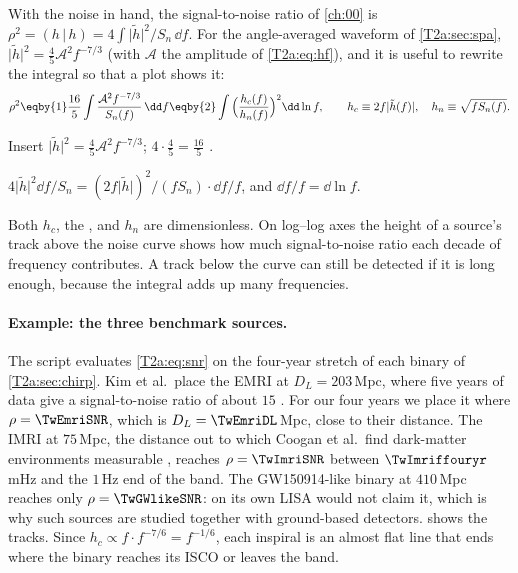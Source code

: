 With the noise in hand, the signal-to-noise ratio of \cref{ch:00} is $\rho^2=(h\,|\,h)=4\int\lvert\tilde h\rvert^2/S_n\,\dd f$. For the angle-averaged waveform of \cref{T2a:sec:spa}, $\lvert\tilde h\rvert^2=\tfrac45\mathcal A^2f^{-7/3}$ (with $\mathcal A$ the amplitude of \eqref{T2a:eq:hf}), and it is useful to rewrite the integral so that a plot shows it:
\begin{equation}
  \rho^2\eqby{1}\frac{16}{5}\int\frac{\mathcal A^2f^{-7/3}}{S_n(f)}\,\dd f
  \eqby{2}\int\Big(\frac{h_c(f)}{h_n(f)}\Big)^2\dd\ln f,
  \qquad h_c\equiv2f\lvert\tilde h(f)\rvert,\quad h_n\equiv\sqrt{fS_n(f)} .
  \label{T2a:eq:snr}
\end{equation}
\begin{explain}
  \item Insert $\lvert\tilde h\rvert^2=\tfrac45\mathcal A^2f^{-7/3}$; $4\cdot\tfrac45=\tfrac{16}{5}$ \cite[eq.~(18)]{Robson2019}.
  \item $4\lvert\tilde h\rvert^2\dd f/S_n=(2f\lvert\tilde h\rvert)^2/(fS_n)\cdot\dd f/f$, and $\dd f/f=\dd\ln f$.
\end{explain}
Both $h_c$, the , and $h_n$ are dimensionless. On log--log axes the height of a source's track above the noise curve shows how much signal-to-noise ratio each decade of frequency contributes. A track below the curve can still be detected if it is long enough, because the integral adds up many frequencies.

\paragraph{Example: the three benchmark sources.}
The script  evaluates \eqref{T2a:eq:snr} on the four-year stretch of each binary of \cref{T2a:sec:chirp}. Kim et al.\ place the EMRI at $D_L=203$\,Mpc, where five years of data give a signal-to-noise ratio of about $15$ \cite[Sec.~III F]{Kim2023}. For our four years we place it where $\rho=\TwEmriSNR$, which is $D_L=\TwEmriDL$\,Mpc, close to their distance. The IMRI at $75$\,Mpc, the distance out to which Coogan et al.\ find dark-matter environments measurable \cite{Coogan2022}, reaches $\rho=\TwImriSNR$ between $\TwImriffouryr$\,mHz and the $1$\,Hz end of the band. The GW150914-like binary at $410$\,Mpc reaches only $\rho=\TwGWlikeSNR$: on its own LISA would not claim it, which is why such sources are studied together with ground-based detectors.  shows the tracks. Since $h_c\propto f\cdot f^{-7/6}=f^{-1/6}$, each inspiral is an almost flat line that ends where the binary reaches its ISCO or leaves the band.

